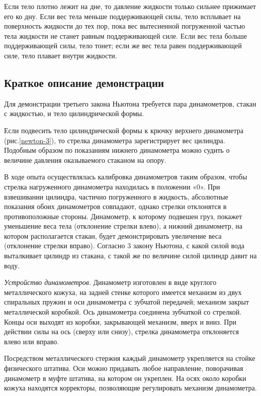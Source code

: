 \documentclass[All.tex]{subfiles}
\begin{document}
Если тело плотно лежит на дне, то давление жидкости только сильнее прижимает его ко дну. 
Если вес тела меньше поддерживающей силы, тело всплывает на поверхность жидкости до тех пор, пока вес вытесненной погруженной частью тела жидкости не станет равным поддерживающей силе. 
Если вес тела больше поддерживающей силы, тело тонет; если же вес тела равен поддерживающей силе, тело плавает внутри жидкости.

\subsection*{\textcolor{PineGreen}{Краткое описание демонстрации}}

Для демонстрации третьего закона Ньютона требуется пара динамометров, стакан с жидкостью, и тело цилиндрической формы.

Если подвесить тело цилиндрической формы к крючку верхнего динамометра (рис.\ref{newton-3}), то стрелка динамометра зарегистрирует вес цилиндра.
Подобным образом по показаниям нижнего динамометра можно судить о величине давления оказываемого стаканом на опору.

В ходе опыта осуществлялась калибровка динамометров таким образом, чтобы стрелка нагруженного динамометра находилась в положении «0».
При взвешивании цилиндра, частично погруженного в жидкость, абсолютные показания обоих динамометров совпадают, однако стрелки отклонятся в противоположные стороны.
Динамометр, к которому подвешен груз, покажет уменьшение веса тела (отклонение стрелки влево), а нижний динамометр, на котором располагается стакан, будет демонстрировать увеличение веса (отклонение стрелки вправо). Согласно 3 закону Ньютона, с какой силой вода выталкивает цилиндр из стакана, с такой же по величине силой цилиндр давит на воду.  

\textit{Устройство динамометров}. Динамометр изготовлен в виде круглого металлического кожуха, на задней стенке которого имеется механизм из двух спиральных пружин и оси динамометра с зубчатой передачей; механизм закрыт металлической коробкой.
Ось динамометра соединена зубчаткой со стрелкой. 
Концы оси выходят из коробки, закрывающей механизм, вверх и вниз.
При действии силы на ось (сверху или снизу), стрелка динамометра отклоняется влево или вправо.

Посредством металлического стержня каждый динамометр укрепляется на стойке физического штатива.
Оси можно придавать любое направление, поворачивая динамометр в муфте штатива, на котором он укреплен.
На осях около коробки кожуха находятся корректоры, позволяющие регулировать механизм динамометра.
\end{document}
